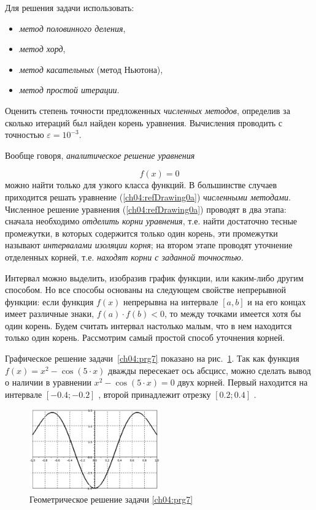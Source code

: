 
Для
решения задачи использовать:
\begin{itemize}
\item \emph{метод половинного деления},
\item \emph{метод хорд},
\item \emph{метод касательных} (метод Ньютона),
\item \emph{метод простой итерации}.
\end{itemize}
Оценить степень точности предложенных \emph{численных методов}, определив за сколько итераций был найден
корень уравнения. Вычисления проводить с точностью  $\varepsilon=10^{-3}$.

Вообще говоря, \emph{аналитическое решение уравнения}

\begin{equation}\label{ch04:refDrawing0a}
f(x)=0
\end{equation}
можно найти только для узкого класса функций. В большинстве случаев приходится решать уравнение (\ref{ch04:refDrawing0a})
\emph{численными методами}. Численное решение уравнения (\ref{ch04:refDrawing0a}) проводят в два этапа: сначала
необходимо \emph{отделить корни уравнения}, т.е. найти достаточно тесные промежутки, в которых содержится
только один корень, эти промежутки называют \emph{интервалами изоляции корня}; на втором этапе проводят
уточнение отделенных корней, т.е. \emph{находят корни с заданной точностью}.

Интервал можно выделить, изобразив график функции, или каким-либо другим способом. Но все способы основаны на следующем
свойстве непрерывной функции: если функция  $f(x)$  непрерывна на интервале  $[a,b]$ и на его концах имеет различные
знаки,  $f(a)\cdot f(b)<0$, то между точками имеется хотя бы один корень. Будем считать интервал настолько малым, что в
нем находится только один корень. Рассмотрим самый простой способ уточнения корней.

Графическое решение задачи~\ref{ch04:prg7} показано на рис.~\ref{ch04:refDrawing1}. 
Так как функция  $f(x)=x^2-\cos (5\cdot x)$
 дважды пересекает ось абсцисс, можно сделать вывод о наличии  в уравнении  $x^2-\cos (5\cdot x)=0$  двух корней.
Первый находится на интервале  $[-0.4;-0.2]$ , второй принадлежит отрезку  $[0.2;0.4]$ .

\begin{figure}[htb]
\begin{center}
\includegraphics[width=0.5\textwidth]{img/ris_4_2}
\caption{Геометрическое решение задачи \ref{ch04:prg7}}
\label{ch04:refDrawing1}
\end{center}
\end{figure}

